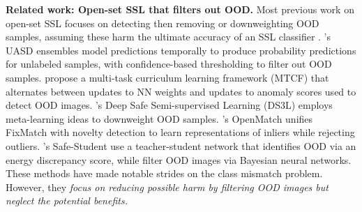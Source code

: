 
\textbf{Related work: Open-set SSL that filters out OOD.}
Most previous work on open-set SSL focuses on detecting then removing or downweighting OOD samples, assuming these harm the ultimate accuracy of an SSL classifier \citep{calderon2022semi,chen2022semi, he2022not}.
\citet{chenSemiSupervisedLearningClass2020}'s UASD ensembles model predictions temporally to produce probability predictions for unlabeled samples, with confidence-based thresholding to filter out OOD samples. 
\citet{yuMultiTaskCurriculumFramework2020} propose a multi-task curriculum learning framework (MTCF) that alternates between updates to NN weights and updates to anomaly scores used to detect OOD images.
\citet{guoSafeDeepSemiSupervised2020}'s Deep Safe Semi-supervised Learning (DS3L) employs meta-learning ideas to downweight OOD samples. 
\citet{saitoOpenMatchOpensetConsistency2021}'s OpenMatch unifies FixMatch with novelty detection to learn representations of inliers while rejecting outliers.
\citet{heSafeStudentSafeDeep2022}'s Safe-Student use a teacher-student network that identifies OOD via an energy discrepancy score, while
\citet{baeSafeSemisupervisedLearning2022} filter OOD images via Bayesian neural networks.
These methods have made notable strides on the class mismatch problem. 
However, they \emph{focus on reducing possible harm by filtering OOD images but neglect the potential benefits.}


